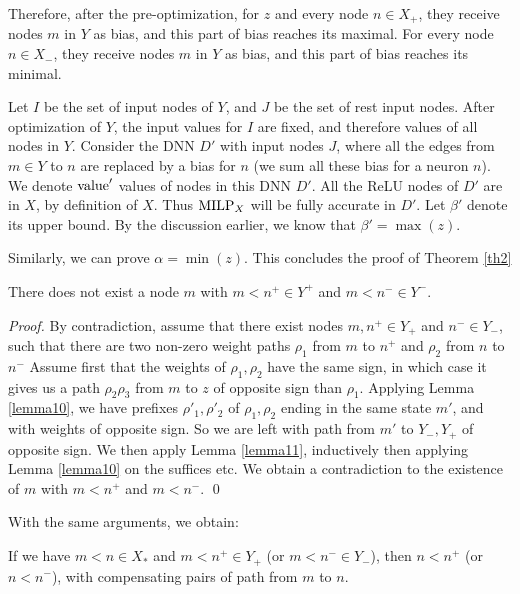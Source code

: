 Therefore, after the pre-optimization, for $z$ and every node $n\in X_+$, they receive nodes $m$ in $Y$ as bias, and this part of bias reaches its maximal. For every node $n\in X_-$,  they receive nodes $m$ in $Y$ as bias, and this part of bias reaches its minimal.


Let $I$ be the set of input nodes of $Y$, and $J$ be the set of rest input nodes.
After optimization of $Y$, the input values for $I$ are fixed, and therefore values of all nodes in $Y$.
Consider the DNN $D'$ with input nodes $J$, where all the 
edges from $m \in Y$ to $n$ are replaced by a bias for $n$ (we sum all these bias for a neuron $n$).
We denote ${\textrm{value}}'$ values of nodes in this DNN $D'$. All the ReLU nodes of $D'$ are in $X$, by definition of $X$.
Thus ${\textrm{MILP}}_X$ will be fully accurate in $D'$. Let $\beta'$ denote its upper bound. By the discussion earlier, we know that $\beta'=\max(z)$.


Similarly, we can prove $\alpha=\min(z)$. This concludes the proof of Theorem \ref{th2}

\iffalse


\begin{lemma}
	There does not exist a node $m$ with $m<n^+ \in Y^+$ and $m<n^- \in Y^-$.
	\end{lemma}
	
	\begin{proof}
	By contradiction, assume that there exist nodes $m, n^+ \in Y_+$ and  $n^
	- \in Y_-$, such that there are two non-zero weight paths $\rho_1$ from $m$ to $n^+$ and $\rho_2$ from $n$ to $n^-$ Assume first that the weights of $\rho_1,\rho_2$ have the same sign, 
	in which case it gives us a path $\rho_2 \rho_3$  from $m$ to $z$ of opposite sign than $\rho_1$. Applying Lemma \ref{lemma10}, we have prefixes $\rho'_1,\rho'_2$ of $\rho_1,\rho_2$ ending in the same state $m'$, and with weights of opposite sign.
	So we are left with path from $m'$ to $Y_-,Y_+$ of opposite sign. 
	We then apply Lemma \ref{lemma11}, inductively then applying Lemma \ref{lemma10} on the suffices etc. We obtain a contradiction to the existence of $m$ with $m<n^+$ and $m<n^-$. \qed
	\end{proof}
	
	
	With the same arguments, we obtain:
	
	\begin{lemma}
	If we have $m<n \in X_*$ and $m < n^+ \in Y_+$ (or $m < n^- \in Y_-$),
	then $n < n^+$ (or $n < n^-$), with compensating pairs of path from $m$ to $n$.
	\end{lemma}
	
